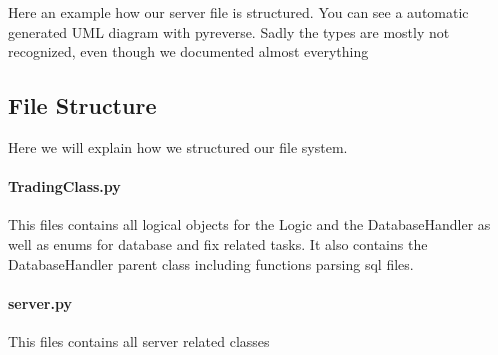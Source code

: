 \documentclass[a4paper, 11pt]{article}
\begin{document}
Here an example how our server file is structured. You can see a automatic generated UML diagram with pyreverse. Sadly
the types are mostly not recognized, even though we documented almost everything

\noindent
{}

\subsection*{File Structure}
Here we will explain how we structured our file system.
\paragraph*{TradingClass.py} This files contains all logical objects for the Logic and the DatabaseHandler as well as enums for database and fix
related tasks. It also contains the DatabaseHandler parent class including functions parsing sql files.
\paragraph*{server.py} This files contains all server related classes
\end{document}
